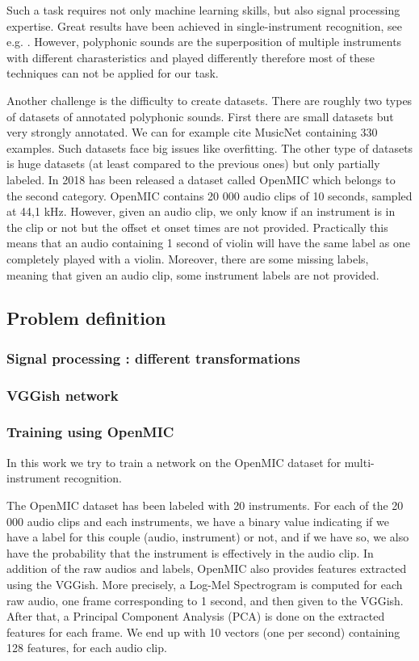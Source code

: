 \documentclass[final]{cvpr}
\begin{document}
Such a task requires not only machine learning skills, but also signal processing expertise. Great results have been achieved in single-instrument recognition, see e.g. \cite{mir}. However, polyphonic sounds are the superposition of multiple instruments with different charasteristics and played differently therefore most of these techniques can not be applied for our task.

Another challenge is the difficulty to create datasets. There are roughly two types of datasets of annotated polyphonic sounds. First there are small datasets but very strongly annotated. We can for example cite MusicNet \cite{MusicNet} containing 330 examples. Such datasets face big issues like overfitting. The other type of datasets is huge datasets (at least compared to the previous ones) but only partially labeled. In 2018 has been released a dataset called OpenMIC \cite{MIC} which belongs to the second category. OpenMIC contains 20 000 audio clips of 10 seconds, sampled at 44,1 kHz. However, given an audio clip, we only know if an instrument is in the clip or not but the offset et onset times are not provided. Practically this means that an audio containing 1 second of violin will have the same label as one completely played with a violin. Moreover, there are some missing labels, meaning that given an audio clip, some instrument labels are not provided. 
\subsection{Problem definition}
\subsubsection{Signal processing : different transformations}
\subsubsection{VGGish network}

\subsubsection{Training using OpenMIC}
In this work we try to train a network on the OpenMIC dataset for multi-instrument recognition. 

The OpenMIC dataset has been labeled with 20 instruments. For each of the 20 000 audio clips and each instruments, we have a binary value indicating if we have a label for this couple (audio, instrument) or not, and if we have so, we also have the probability that the instrument is effectively in the audio clip. In addition of the raw audios and labels, OpenMIC also provides features extracted using the VGGish. More precisely, a Log-Mel Spectrogram is computed for each raw audio, one frame corresponding to 1 second, and then given to the VGGish. After that, a Principal Component Analysis (PCA) is done on the extracted features for each frame. We end up with 10 vectors (one per second) containing 128 features, for each audio clip.
\end{document}
